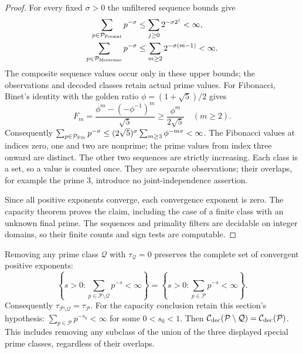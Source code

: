 \documentclass[11pt]{article}
\theoremstyle{definition}
\begin{document}
\begin{proof}
For every fixed $\sigma>0$ the unfiltered sequence bounds give
\[
 \begin{aligned}
 \sum_{p\in\mathcal P_{\rm Fermat}}p^{-\sigma}
       &\le\sum_{j\ge0}2^{-\sigma2^j}<\infty,\\
 \sum_{p\in\mathcal P_{\rm Mersenne}}p^{-\sigma}
       &\le\sum_{m\ge2}2^{-\sigma(m-1)}<\infty .
 \end{aligned}
\]
The composite sequence values occur only in these upper bounds;
the observations and decoded classes retain actual prime values.
For Fibonacci, Binet's identity with the golden ratio
$\phi=(1+\sqrt5)/2$ gives
\[
 F_m=\frac{\phi^m-(-\phi^{-1})^m}{\sqrt5}
       \ge\frac{\phi^m}{2\sqrt5}\quad(m\ge2).
\]
Consequently
$\sum_{p\in\mathcal P_{\rm Fib}}p^{-\sigma}
 \le(2\sqrt5)^\sigma\sum_{m\ge3}\phi^{-m\sigma}<\infty$.
The Fibonacci values at indices zero, one and two are nonprime;
the prime values from index three onward are distinct.
The other two sequences are strictly increasing.
Each class is a set, so a value is counted once.
They are separate observations; their overlaps, for example
the prime $3$, introduce no joint-independence assertion.

Since all positive exponents converge, each convergence
exponent is zero.
The capacity theorem proves the claim, including the case
of a finite class with an unknown final prime.
The sequences and primality filters are decidable on integer
domains, so their finite counts and sign tests are computable.
\end{proof}

Removing any prime class $\mathcal Q$ with
$\tau_{\mathcal Q}=0$ preserves the complete set of
convergent positive exponents:
\[
 \left\{s>0:\sum_{p\in\mathcal P\setminus\mathcal Q}p^{-s}<\infty\right\}
 =
 \left\{s>0:\sum_{p\in\mathcal P}p^{-s}<\infty\right\}.
\]
Consequently $\tau_{\mathcal P\setminus\mathcal Q}=\tau_{\mathcal P}$.
For the capacity conclusion retain this section's hypothesis:
$\sum_{p\in\mathcal P}p^{-s_0}<\infty$ for some $0<s_0<1$.
Then
$\mathcal C_{\rm dec}(\mathcal P\setminus\mathcal Q)
 =\mathcal C_{\rm dec}(\mathcal P)$.
This includes removing any subclass of the union of the three
displayed special prime classes, regardless of their overlaps.
\end{document}
